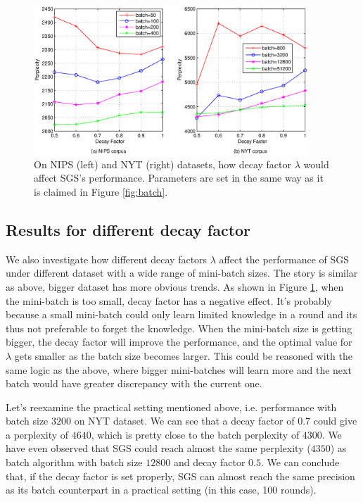\documentclass{article} %
\begin{document}
\begin{figure}[ht]
\vskip 0.2in
\begin{center}
\centerline{\includegraphics[width=\columnwidth, height=2.2in]{pics/decay.eps}}
\caption{ On NIPS (left) and NYT (right) datasets, how decay factor $\lambda$ 
would affect SGS's performance. Parameters are set in the same way as it is claimed in Figure \ref{fig:batch}.}
\label{fig:decay}
\end{center}
\vskip -0.2in
\end{figure} 

\subsection{Results for different decay factor}
We also investigate how different decay factors $\lambda$ affect the performance of SGS under different dataset with a wide range of mini-batch sizes. The story is similar as above, bigger dataset has more obvious trends. As shown in Figure \ref{fig:decay}, when the mini-batch is too small, decay factor has a negative effect. It's probably because a small mini-batch could only learn limited knowledge in a round and its thus not preferable to forget the knowledge. When the mini-batch size is getting bigger, the decay factor will improve the performance, and the optimal value for $\lambda$ gets smaller as the batch size becomes larger. This could be reasoned with the same logic as the above, where bigger mini-batches will learn more and the next batch would have greater discrepancy with the current one. 

Let's reexamine the practical setting mentioned above, i.e. performance with batch size $3200$ on NYT dataset. We can see that a decay factor of $0.7$ could give a perplexity of $4640$, which is pretty close to the batch perplexity of $4300$. We have even observed that SGS could reach almost the same perplexity ($4350$) as batch algorithm with batch size $12800$ and decay factor $0.5$. We can conclude that, if the decay factor is set properly, SGS can almost reach the same precision as its batch counterpart in a practical setting (in this case, 100 rounds). 
\end{document}
